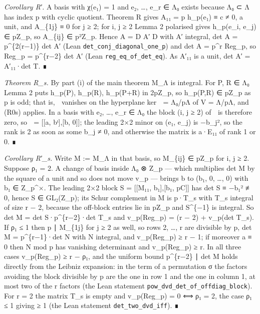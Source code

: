 \documentclass[11pt,a4paper]{article}
\theoremstyle{named}
\begin{document}
\textit{Corollary R′.} A basis with χ(e₁) = 1 and e₂, …, e\_r ∈ Λ₀ exists because Λ₀ ⊂ Λ has index p with cyclic quotient. Theorem R gives A₁₁ = p h\_p(e₁) ≡ c ≠ 0, a unit, and A\_\{1j\} ≡ 0 for j ≥ 2; for i, j ≥ 2 Lemma 2 polarised gives h\_p(e\_i, e\_j) ∈ pZ\_p, so A\_\{ij\} ∈ p²Z\_p. Hence A = D A′ D with A′ integral, det A = p\textasciicircum{}\{2(r−1)\} det A′ (Lean \texttt{det\_\allowbreak{}conj\_\allowbreak{}diagonal\_\allowbreak{}one\_\allowbreak{}p}) and det A = p\textasciicircum{}r Reg\_p, so Reg\_p = p\textasciicircum{}\{r−2\} det A′ (Lean \texttt{reg\_\allowbreak{}eq\_\allowbreak{}of\_\allowbreak{}det\_\allowbreak{}eq}). As A′₁₁ is a unit, det A′ = A′₁₁·det T. ∎

\textit{Theorem R\_s.} By part (i) of the main theorem M\_Λ is integral. For P, R ∈ Λ₀ Lemma 2 puts h\_p(P), h\_p(R), h\_p(P+R) in 2pZ\_p, so h\_p(P,R) ∈ pZ\_p as p is odd; that is,  vanishes on the hyperplane ker  = Λ₀/pΛ of V = Λ/pΛ, and (R0s) applies. In a basis with e₂, …, e\_r ∈ Λ₀ the block (i, j ≥ 2) of  is therefore zero, so  = [[a, bᵗ],[b, 0]]; the leading 2×2 minor on (e₁, e\_j) is −b\_j², so the rank is 2 as soon as some b\_j ≠ 0, and otherwise the matrix is a·E₁₁ of rank 1 or 0. ∎

\textit{Corollary R′\_s.} Write M := M\_Λ in that basis, so M\_\{ij\} ∈ pZ\_p for i, j ≥ 2. Suppose ρ₁ = 2. A change of basis inside Λ₀ ⊗ Z\_p — which multiplies det M by the square of a unit and so does not move v\_p — brings b to (b₁, 0, …, 0) with b₁ ∈ Z\_p\textasciicircum{}×. The leading 2×2 block S = [[M₁₁, b₁],[b₁, pC]] has det S ≡ −b₁² ≢ 0, hence S ∈ GL₂(Z\_p); its Schur complement in M is p·T\_s with T\_s integral of size r − 2, because the off-block entries lie in pZ\_p and S\textasciicircum{}\{−1\} is integral. So det M = det S·p\textasciicircum{}\{r−2\}·det T\_s and v\_p(Reg\_p) = (r − 2) + v\_p(det T\_s). If ρ₁ ≤ 1 then p ∣ M\_\{1j\} for j ≥ 2 as well, so rows 2, …, r are divisible by p, det M = p\textasciicircum{}\{r−1\}·det N with N integral, and v\_p(Reg\_p) ≥ r − 1; if moreover a ≡ 0 then N mod p has vanishing determinant and v\_p(Reg\_p) ≥ r. In all three cases v\_p(Reg\_p) ≥ r − ρ₁, and the uniform bound p\textasciicircum{}\{r−2\} ∣ det M holds directly from the Leibniz expansion: in the term of a permutation σ the factors avoiding the block divisible by p are the one in row 1 and the one in column 1, at most two of the r factors (the Lean statement \texttt{pow\_\allowbreak{}dvd\_\allowbreak{}det\_\allowbreak{}of\_\allowbreak{}offdiag\_\allowbreak{}block}). For r = 2 the matrix T\_s is empty and v\_p(Reg\_p) = 0 ⟺ ρ₁ = 2, the case ρ₁ ≤ 1 giving ≥ 1 (the Lean statement \texttt{det\_\allowbreak{}two\_\allowbreak{}dvd\_\allowbreak{}iff}). ∎
\end{document}
